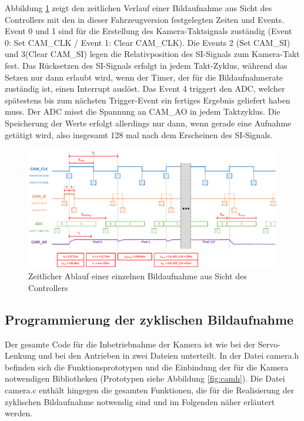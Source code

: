 Abbildung \ref{fig:CAMProcedure} zeigt den zeitlichen Verlauf einer Bildaufnahme aus Sicht des Controllers mit den in dieser Fahrzeugversion festgelegten Zeiten und Events. Event 0 und 1 sind für die Erstellung des Kamera-Taktsignals zuständig (Event 0: Set CAM\_CLK / Event 1: Clear CAM\_CLK). Die Events 2 (Set CAM\_SI) und 3(Clear CAM\_SI) legen die Relativposition des SI-Signals zum Kamera-Takt fest. Das Rücksetzen des SI-Signals erfolgt in jedem Takt-Zyklus, während das Setzen nur dann erlaubt wird, wenn der Timer, der für die Bildaufnahmerate zuständig ist, einen Interrupt auslöst. Das Event 4 triggert den ADC, welcher spätestens bis zum nächsten Trigger-Event ein fertiges Ergebnis geliefert haben muss. Der ADC misst die Spannung an CAM\_AO in jedem Taktzyklus. Die Speicherung der Werte erfolgt allerdings nur dann, wenn gerade eine Aufnahme getätigt wird, also insgesamt 128 mal nach dem Erscheinen des SI-Signals.

\begin{figure}[H] %
\includegraphics[width=\textwidth]{sec7/images/CAMProcedure} 
\centering
\captionsetup{width=.95\textwidth}
\caption[Zeitlicher Ablauf einer einzelnen Bildaufnahme aus Sicht des Controllers]{Zeitlicher Ablauf einer einzelnen Bildaufnahme aus Sicht des Controllers}\centering
\label{fig:CAMProcedure}
\end{figure}

\newpage

\subsection{Programmierung der zyklischen Bildaufnahme}\label{Sec7Sub3}

Der gesamte Code für die Inbetriebnahme der Kamera ist wie bei der Servo-Lenkung und bei den Antrieben in zwei Dateien unterteilt. In der Datei \glqq{}camera.h\grqq{} befinden sich die Funktionsprototypen und die Einbindung der für die Kamera notwendigen Bibliotheken (Prototypen siehe Abbildung \ref{fig:camh}). Die Datei \glqq{}camera.c\grqq{} enthält hingegen die gesamten Funktionen, die für die Realisierung der zyklischen Bildaufnahme notwendig sind und im Folgenden näher erläutert werden.

